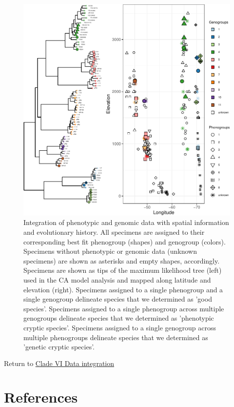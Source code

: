 \documentclass[
  11pt,
]{article}
\begin{document}
\begin{figure}
\includegraphics{Supplementary_Material_files/figure-latex/cladeVIfinalDelimitation2-1} \caption{Integration of phenotypic and genomic data with spatial information and evolutionary history. All specimens are assigned to their corresponding best fit phenogroup (shapes) and genogroup (colors). Specimens without phenotypic or genomic data (unknown specimens) are shown as asterisks and empty shapes, accordingly. Specimens are shown as tips of the maximum likelihood tree (left) used in the CA model analysis and mapped along latitude and elevation (right). Specimens assigned to a single phenogroup and a single genogroup delineate species that we determined as 'good species'. Specimens assigned to a single phenogroup across multiple genogroups delineate species that we determined as 'phenotypic cryptic species'. Specimens assigned to a single genogroup across multiple phenogroups delineate species that we determined as 'genetic cryptic species'.}\label{fig:cladeVIfinalDelimitation2}
\end{figure}

Return to \protect\hyperlink{data-integration-6}{Clade VI Data integration}
\pagebreak

\hypertarget{references}{%
\section{References}\label{references}}
\end{document}
